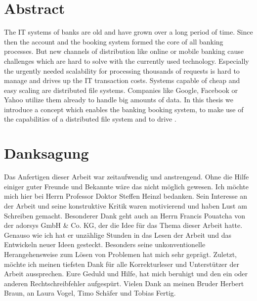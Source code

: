 \documentclass[12pt,oneside,a4paper,parskip]{scrbook}
\newcommand\blankpage{%
    \null
    \thispagestyle{empty}%
    \newpage}
\begin{document}
{\let\clearpage\relax\chapter*{Abstract}}

The IT systems of banks are old and have grown over a long period of time. Since then the account and the booking system formed the core of all banking processes. But new channels of distribution like online or mobile banking cause challenges which are hard to solve with the currently used technology. Especially the urgently needed scalability for processing thousands of requests is hard to manage and drives up the IT transaction costs. Systems capable of cheap and easy scaling are distributed file systems. Companies like Google, Facebook or Yahoo utilize them already to handle big amounts of data. In this thesis we introduce a concept which enables the banking booking system, to make use of the capabilities of a distributed file system and to drive .

\afterpage{\blankpage}

\chapter*{Danksagung}

Das Anfertigen dieser Arbeit war zeitaufwendig und anstrengend. Ohne die Hilfe einiger guter Freunde und Bekannte wäre das nicht möglich gewesen. Ich möchte mich hier bei Herrn Professor Doktor Steffen Heinzl bedanken. Sein Interesse an der Arbeit und seine konstruktive Kritik waren motivierend und haben Lust am Schreiben gemacht. Besonderer Dank geht auch an Herrn Francis Pouatcha von der adorsys GmbH \& Co. KG, der die Idee für das Thema dieser Arbeit hatte. Genauso wie ich hat er unzählige Stunden in das Lesen der Arbeit und das Entwickeln neuer Ideen gesteckt. Besonders seine unkonventionelle Herangehensweise zum Lösen von Problemen hat mich sehr geprägt. Zuletzt, möchte ich meinen tiefsten Dank für alle Korrekturleser und Unterstützer der Arbeit aussprechen. Eure Geduld und Hilfe, hat mich beruhigt und den ein oder anderen Rechtschreibfehler aufgespürt. Vielen Dank an meinen Bruder Herbert Braun, an Laura Vogel, Timo Schäfer und Tobias Fertig.


\afterpage{\blankpage}
\tableofcontents										



\end{document}
